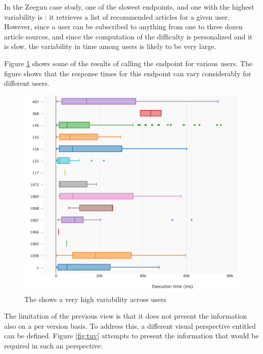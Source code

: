 \documentclass[conference]{IEEEtran}
\begin{document}
  In the Zeeguu case study, one of the slowest endpoints, and one with the highest variability is \epFeedItems: it retrieves a list of recommended articles for a given user. However, since a user can be subscribed to anything from one to three dozen article sources, and since the computation of the difficulty is personalized and it is slow, the variability in time among users is likely to be very large. 


  Figure \ref{fig:tpu} shows some of the results of calling the \epFeedItems endpoint for various users. The figure shows that the response times for this endpoint can vary considerably for different users. 

  \begin{figure}[!ht]
    \centering
    \includegraphics[width=\linewidth]{time_per_user}
    \caption{The \epFeedItems shows a very high variability across users}
    \label{fig:tpu}
  \end{figure}

  \niceseparator

  The limitation of the previous view is that it does not present the information also on a per version basis. To address this, a different visual perspective entitled  can be defined. Figure \ref{fig:tuv} attempts to present the information that would be required in such an perspective: 
\end{document}
